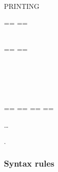 \begin{syntax}
  \begin{1=}
     \\
  \end{1=}
  \begin{1=}
    \literal \\
    \textname \\
  \end{1=}
  \begin{0-1}
    \begin{1=}
       \\
    \end{1=}
    \begin{1=}
      \literal \\
      \libraryname
    \end{1=}
  \end{0-1}

  \begin{0-1}
     PRINTING
  \end{0-1}

  \begin{0-1}
    \begin{1=}
      \begin{1=}
        == \pseudotext == \\
        \identifier \\
        \literal
      \end{1=}
      \begin{1=}
        == \pseudotext == \\
        \identifier \\
        \literal
      \end{1=} \\

      \begin{1=}
         \\
      \end{1=}
      ==  ==
      ==  ==
    \end{1=}\ldots
  \end{0-1}
  .
\end{syntax}


\subsubsection{Syntax rules}

